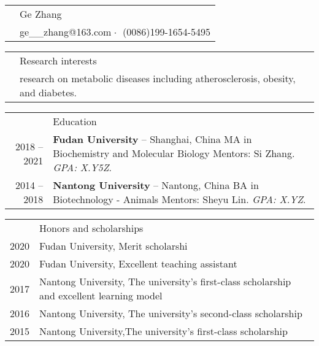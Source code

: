 \documentclass[letterpaper, 11pt]{article}
\newcommand{\headingfont}{\Large\color{OliveGreen}}
\newenvironment{SectionTable}[1]{
	\renewcommand*{\arraystretch}{1.7}
	\setlength{\tabcolsep}{10pt}
	\begin{longtable}{Rp{5.2in}} & #1 \\}
{\end{longtable}\vspace{-.3cm}}
\newenvironment{SectionTableSingleSpace}[1]{
	\renewcommand*{\arraystretch}{1.2}
	\setlength{\tabcolsep}{10pt}
	\begin{longtable}{Rp{5.2in}} & #1 \\[0.6em]}
{\end{longtable}\vspace{-.3cm}}
\begin{document}

\begin{SectionTable}{\Huge Ge Zhang} & 
ge\_\_zhang@163.com$\;\boldsymbol{\cdot}\;$ \newline
(0086)199-1654-5495
\end{SectionTable}


\begin{SectionTable}{\headingfont Research interests}
& research on metabolic diseases including atherosclerosis, obesity, and diabetes.
\end{SectionTable}


\begin{SectionTable}{\headingfont Education}
2018 -- 2021 & 
\textbf{Fudan University} -- Shanghai, China \newline
MA in Biochemistry and Molecular Biology \newline 
Mentors: Si Zhang. \textit{GPA: X.Y5Z}. \\

2014 -- 2018 & 
\textbf{Nantong University} -- Nantong, China \newline
BA in Biotechnology - Animals \newline 
Mentors: Sheyu Lin. \textit{GPA: X.YZ}. \\



\end{SectionTable}


\begin{SectionTableSingleSpace}{\headingfont Honors and scholarships}
2020 & 
Fudan University, Merit scholarshi \\

2020 &
Fudan University, Excellent teaching assistant \\

2017 &
Nantong University, The university's first-class scholarship and excellent learning model \\

2016 &
Nantong University, The university's second-class scholarship  \\

2015 &
Nantong University,The university's first-class scholarship 
\end{SectionTableSingleSpace}
\end{document}
